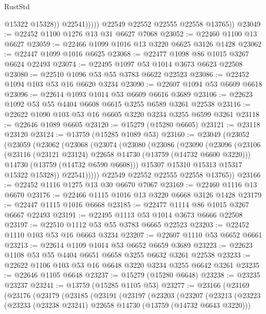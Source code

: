 \begin{lexlean}{RustStd}
\begin{coremodule}
                      @15322
                      @15328))
                  @22541)))))
        @22549
        @22552
        @22555
        @22558
        @13765))
@23049 := @22452 @1100 @1276 @13 @31 @6627 @7068
@23052 := @22460 @1100 @13 @6627
@23059 := @22466 @1099 @1016 @13 @3220 @6625 @3126 @1428
@23062 := @22447 @1099 @1016 @6625
@23068 := @22477 @1098 @86 @1015 @3267 @6624 @22493
@23074 := @22495 @1097 @53 @1014 @3673 @6623 @22508
@23080 := @22510 @1096 @53 @55 @3783 @6622 @22523
@23086 := @22452 @1094 @103 @53 @16 @6620 @3234
@23090 := @22607 @1094 @53 @6609 @6618
@23096 := @22614 @1093 @1014 @53 @6609 @6616 @3689
@23106 := @22623 @1092 @53 @55 @4404 @6608 @6615 @3255 @6589 @3261 @22538
@23116 := @22622 @1090 @103 @53 @16 @6605 @3220 @3234 @3255 @6599 @3261
@23118 := @22646 @1089 @6605
@23120 := @15279 (@15280 @6605)
@23121 := @23118 @23120
@23124 := @13759 (@15285 @1089 @53)
@23160 := @23049
    (@23052
      (@23059
        (@23062
          (@23068
            (@23074
              (@23080
                (@23086
                  (@23090
                    (@23096
                      (@23106
                        (@23116 (@23121 @23124) @22658 @14730 (@13759 (@14732 @6600 @3220)))
                        @14730
                        (@13759 (@14732 @6590 @6608)))
                      @15307
                      @15310
                      @15313
                      @15317
                      @15322
                      @15328))
                  @22541)))))
        @22549
        @22552
        @22555
        @22558
        @13765))
@23166 := @22452 @1116 @1275 @13 @30 @6670 @7067
@23169 := @22460 @1116 @13 @6670
@23176 := @22466 @1115 @1016 @13 @3220 @6668 @3126 @1428
@23179 := @22447 @1115 @1016 @6668
@23185 := @22477 @1114 @86 @1015 @3267 @6667 @22493
@23191 := @22495 @1113 @53 @1014 @3673 @6666 @22508
@23197 := @22510 @1112 @53 @55 @3783 @6665 @22523
@23203 := @22452 @1110 @103 @53 @16 @6663 @3234
@23207 := @22607 @1110 @53 @6652 @6661
@23213 := @22614 @1109 @1014 @53 @6652 @6659 @3689
@23223 := @22623 @1108 @53 @55 @4404 @6651 @6658 @3255 @6632 @3261 @22538
@23233 := @22622 @1106 @103 @53 @16 @6648 @3220 @3234 @3255 @6642 @3261
@23235 := @22646 @1105 @6648
@23237 := @15279 (@15280 @6648)
@23238 := @23235 @23237
@23241 := @13759 (@15285 @1105 @53)
@23277 := @23166
    (@23169
      (@23176
        (@23179
          (@23185
            (@23191
              (@23197
                (@23203
                  (@23207
                    (@23213
                      (@23223
                        (@23233 (@23238 @23241) @22658 @14730 (@13759 (@14732 @6643 @3220)))

\end{coremodule}
\end{lexlean}
